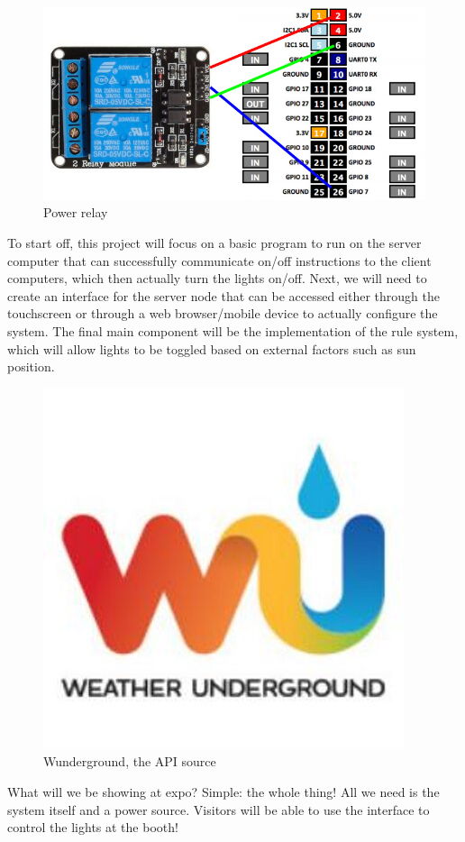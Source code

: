 \documentclass{article}
\begin{document}
\begin{figure}[h!]
\centering
\includegraphics[scale=0.5]{relay.jpg}
\caption{Power relay}
\label{fig:relay}
\end{figure}

To start off, this project will focus on a basic program to run on the server
computer that can successfully communicate on/off instructions to the client
computers, which then actually turn the lights on/off.  Next, we will need to
create an interface for the server node that can be accessed either through the
touchscreen or through a web browser/mobile device to actually configure the
system.  The final main component will be the implementation of the rule
system, which will allow lights to be toggled based on external factors such as
sun position.

\begin{figure}[h!]
\centering
\includegraphics[scale=0.5]{wunder.jpeg}
\caption{Wunderground, the API source}
\label{fig:relay}
\end{figure}

What will we be showing at expo?  Simple: the whole thing!  All we need is the
system itself and a power source.  Visitors will be able to use the interface
to control the lights at the booth!
\end{document}
